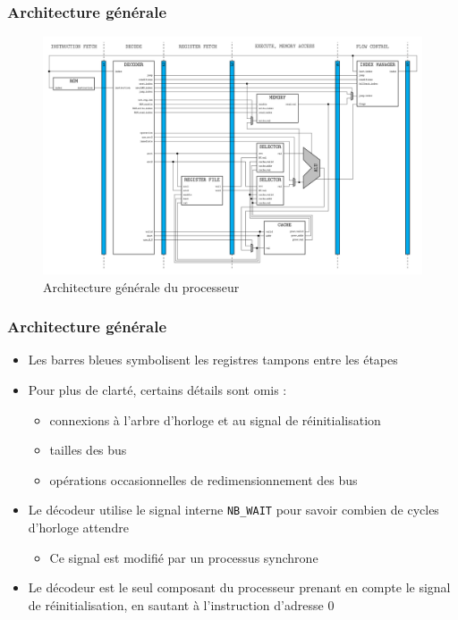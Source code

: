 \documentclass{beamer}
\begin{document}
\begin{frame}
\frametitle{Architecture générale}
\begin{figure}
\centering
\includegraphics[width=\textwidth]{doc.png}
\caption{Architecture générale du processeur}
\end{figure}
\end{frame}
\begin{frame}
\frametitle{Architecture générale}
\begin{itemize}
\item Les barres bleues symbolisent les registres tampons entre les étapes
\item Pour plus de clarté, certains détails sont omis :
    \begin{itemize}
    \item connexions à l'arbre d'horloge et au signal de réinitialisation
    \item tailles des bus
    \item opérations occasionnelles de redimensionnement des bus
    \end{itemize}
\item Le décodeur utilise le signal interne \texttt{NB\_WAIT} pour savoir
    combien de cycles d'horloge attendre
    \begin{itemize}
    \item Ce signal est modifié par un processus synchrone
    \end{itemize}
\item Le décodeur est le seul composant du processeur prenant en compte le
    signal de réinitialisation, en sautant à l'instruction d'adresse 0
\end{itemize}
\end{frame}
\end{document}
